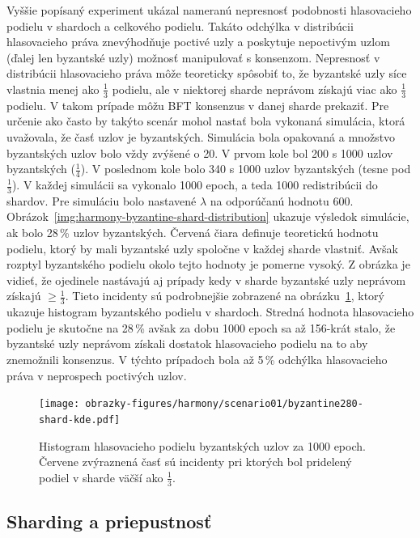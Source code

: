 Vyššie popísaný experiment ukázal nameranú nepresnosť podobnosti hlasovacieho podielu v shardoch a celkového podielu. Takáto odchýlka v distribúcii hlasovacieho práva znevýhodňuje poctivé uzly a poskytuje nepoctivým uzlom (ďalej len byzantské uzly) možnosť manipulovať s konsenzom. Nepresnosť v distribúcii hlasovacieho práva môže teoreticky spôsobiť to, že byzantské uzly síce vlastnia menej ako $\frac{1}{3}$ podielu, ale v niektorej sharde neprávom získajú viac ako $\frac{1}{3}$ podielu. V takom prípade môžu BFT konsenzus v danej sharde prekaziť. Pre určenie ako často by takýto scenár mohol nastať bola  vykonaná simulácia, ktorá uvažovala, že časť uzlov je byzantských. Simulácia bola opakovaná a množstvo byzantských uzlov bolo vždy zvýšené o 20. V prvom kole bol 200 s 1000 uzlov byzantských ($\frac{1}{4}$). V poslednom kole bolo 340 s 1000 uzlov byzantských (tesne pod $\frac{1}{3}$). V každej simulácii sa vykonalo 1000 epoch, a teda 1000 redistribúcii do shardov. Pre simuláciu bolo nastavené $\lambda$ na odporúčanú hodnotu 600. Obrázok~\ref{img:harmony-byzantine-shard-distribution} ukazuje výsledok simulácie, ak bolo 28\,\% uzlov byzantských. Červená čiara definuje teoretickú hodnotu podielu, ktorý by mali byzantské uzly spoločne v každej sharde vlastniť. Avšak rozptyl byzantského podielu okolo tejto hodnoty je pomerne vysoký. Z obrázka je vidieť, že ojedinele nastávajú aj prípady kedy v sharde byzantské uzly neprávom získajú $\geq \frac{1}{3}$. Tieto incidenty sú podrobnejšie zobrazené na obrázku~\ref{img:harmony-byzantine-shard-kde}, ktorý ukazuje histogram byzantského podielu v shardoch. Stredná hodnota hlasovacieho podielu je skutočne na 28\,\% avšak za dobu 1000 epoch sa až 156-krát stalo, že byzantské uzly neprávom získali dostatok hlasovacieho podielu na to aby znemožnili konsenzus. V týchto prípadoch bola až 5\,\% odchýlka hlasovacieho práva v neprospech poctivých uzlov. 

\begin{figure}[H]
	\centering
	\texttt{[image: obrazky-figures/harmony/scenario01/byzantine280-shard-kde.pdf]}
	\caption{Histogram hlasovacieho podielu byzantských uzlov za 1000 epoch. Červene zvýraznená časť sú incidenty pri ktorých bol pridelený podiel v sharde väčší ako $\frac{1}{3}$.}
	\label{img:harmony-byzantine-shard-kde}
\end{figure}

\subsection{Sharding a priepustnosť}

